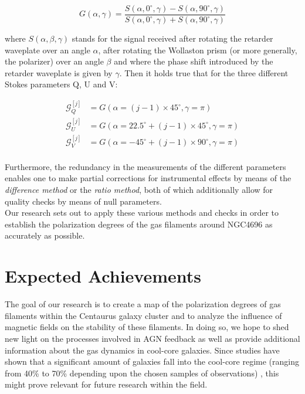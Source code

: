 \documentclass[twoside,single]{lion-msc}
\begin{document}
    \begin{equation}
        G(\alpha, \gamma) = \frac{S(\alpha, 0^{\circ}, \gamma) - S(\alpha, 90^{\circ}, \gamma)}{S(\alpha, 0^{\circ}, \gamma) + S(\alpha, 90^{\circ}, \gamma)}
    \end{equation}

    where $S(\alpha, \beta, \gamma)$ stands for the signal received after rotating the retarder waveplate over an angle $\alpha$, after rotating the Wollaston prism (or more generally, the polarizer) over an angle $\beta$ and where the phase shift introduced by the retarder waveplate is given by $\gamma$. Then it holds true that for the three different Stokes parameters Q, U and V:
    
    \begin{align*}
        \mathcal{G}^{[j]}_{Q} &= G(\alpha = (j-1) \times 45^{\circ}, \gamma = \pi) \\
        \mathcal{G}^{[j]}_{U} &= G(\alpha = 22.5^{\circ} + (j-1) \times 45^{\circ}, \gamma = \pi) \\
        \mathcal{G}^{[j]}_{V} &= G(\alpha = -45^{\circ} + (j-1) \times 90^{\circ}, \gamma = \pi) \\
    \end{align*}

    Furthermore, the redundancy in the measurements of the different parameters enables one to make partial corrections for instrumental effects by means of the \textit{difference method} or the \textit{ratio method}, both of which additionally allow for quality checks by means of null parameters. \\
    Our research sets out to apply these various methods and checks in order to establish the polarization degrees of the gas filaments around NGC4696 as accurately as possible.
    
    
   
\chapter{Expected Achievements}

    The goal of our research is to create a map of the polarization degrees of gas filaments within the Centaurus galaxy cluster and to analyze the influence of magnetic fields on the stability of these filaments. In doing so, we hope to shed new light on the processes involved in AGN feedback as well as provide additional information about the gas dynamics in cool-core galaxies. Since studies have shown that a significant amount of galaxies fall into the cool-core regime (ranging from 40\% to 70\% depending upon the chosen samples of observations) \citep{Hudson2010, Chen2007, Sanderson2008}, this might prove relevant for future research within the field.
    
\end{document}
